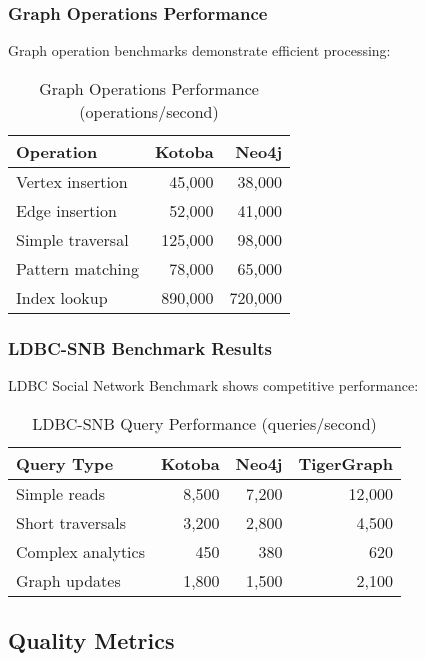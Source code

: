 \documentclass[11pt,a4paper]{article}
\begin{document}
\subsubsection{Graph Operations Performance}
\label{subsubsec:graph_bench}

Graph operation benchmarks demonstrate efficient processing:

\begin{table}[H]
\centering
\caption{Graph Operations Performance (operations/second)}
\label{tab:graph_perf}
\begin{tabular}{@{}lrr@{}}
\toprule
Operation & Kotoba & Neo4j \\
\midrule
Vertex insertion & 45,000 & 38,000 \\
Edge insertion & 52,000 & 41,000 \\
Simple traversal & 125,000 & 98,000 \\
Pattern matching & 78,000 & 65,000 \\
Index lookup & 890,000 & 720,000 \\
\bottomrule
\end{tabular}
\end{table}

\subsubsection{LDBC-SNB Benchmark Results}
\label{subsubsec:ldbc_benchmark}

LDBC Social Network Benchmark shows competitive performance:

\begin{table}[H]
\centering
\caption{LDBC-SNB Query Performance (queries/second)}
\label{tab:ldbc_perf}
\begin{tabular}{@{}lrrr@{}}
\toprule
Query Type & Kotoba & Neo4j & TigerGraph \\
\midrule
Simple reads & 8,500 & 7,200 & 12,000 \\
Short traversals & 3,200 & 2,800 & 4,500 \\
Complex analytics & 450 & 380 & 620 \\
Graph updates & 1,800 & 1,500 & 2,100 \\
\bottomrule
\end{tabular}
\end{table}

\subsection{Quality Metrics}
\label{subsec:quality}
\end{document}
